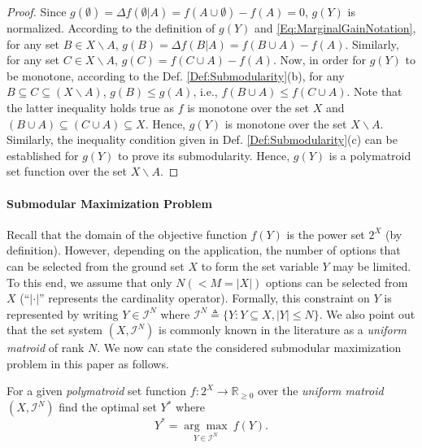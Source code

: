 \documentclass[conference]{IEEEtran}
\newcommand{\R}{\mathbb{R}}
\begin{document}
\begin{proof}
Since $g(\emptyset)=\Delta f(\emptyset \vert A) = f(A\cup\emptyset)-f(A)=0$, $g(Y)$ is normalized. 
According to the definition of $g(Y)$ and \eqref{Eq:MarginalGainNotation}, for any set $B\in X \backslash A$, $g(B) = \Delta f(B\vert A) = f(B \cup A)-f(A)$. Similarly, for any set $C\in X\backslash A$, $g(C)=f(C\cup A)-f(A)$. 
Now, in order for $g(Y)$ to be monotone, according to the Def. \ref{Def:Submodularity}(b), for any $B\subseteq C\subseteq (X\backslash A)$,  $g(B)\leq g(A)$, i.e., $f(B\cup A) \leq f(C\cup A)$. Note that the latter inequality holds true as $f$ is monotone over the set $X$ and $(B\cup A) \subseteq (C\cup A) \subseteq X$. Hence, $g(Y)$ is monotone over the set $X \backslash A$. Similarly, the inequality condition given in Def. \ref{Def:Submodularity}(c) can be established for $g(Y)$ to prove its submodularity. Hence, $g(Y)$ is a polymatroid set function over the set $X \backslash A$. 
\end{proof}


\paragraph*{\textbf{Submodular Maximization Problem}}

Recall that the domain of the objective function $f(Y)$ is the power set $2^X$ (by definition). However, depending on the application, the number of options that can be selected from the ground set $X$ to form the set variable $Y$ may be limited. To this end, we assume that only $N(< M = \vert X \vert)$ options can be selected from $X$ (``$\vert \cdot \vert$'' represents the cardinality operator). Formally, this constraint on $Y$ is represented by writing $Y\in\mathcal{I}^N$ where $\mathcal{I}^N\triangleq \{Y:Y \subseteq X, \vert Y \vert \leq N\}$. We also point out that the set system $(X,\mathcal{I}^N)$ is commonly known in the literature \cite{Liu2018} as a \emph{uniform matroid} of rank $N$. We now can state the considered submodular maximization problem in this paper as follows. 

For a given \emph{polymatroid} set function $f:2^X\rightarrow \R_{\geq 0}$ over the \emph{uniform matroid} $(X,\mathcal{I}^N)$ find the optimal set $Y^*$ where  
\begin{equation}\label{Eq:SubmodularMaximizationProblem}
    Y^* = \underset{Y\in\mathcal{I}^N}{\arg\max} \ f(Y).
\end{equation}
\end{document}
